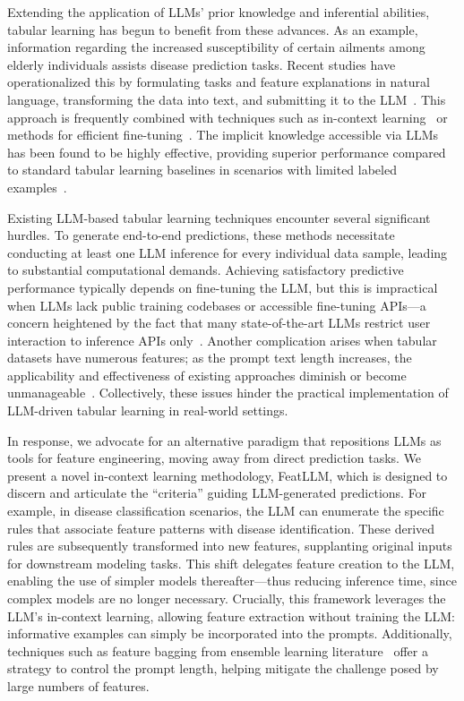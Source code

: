Extending the application of LLMs' prior knowledge and inferential abilities, tabular learning has begun to benefit from these advances. As an example, information regarding the increased susceptibility of certain ailments among elderly individuals assists disease prediction tasks. Recent studies have operationalized this by formulating tasks and feature explanations in natural language, transforming the data into text, and submitting it to the LLM~\cite{dinh2022lift,wang2023anypredict}. This approach is frequently combined with techniques such as in-context learning~\cite{nam2023semi} or methods for efficient fine-tuning~\cite{dinh2022lift,hegselmann2023tabllm}. The implicit knowledge accessible via LLMs has been found to be highly effective, providing superior performance compared to standard tabular learning baselines in scenarios with limited labeled examples~\cite{hegselmann2023tabllm}.

Existing LLM-based tabular learning techniques encounter several significant hurdles. To generate end-to-end predictions, these methods necessitate conducting at least one LLM inference for every individual data sample, leading to substantial computational demands. Achieving satisfactory predictive performance typically depends on fine-tuning the LLM, but this is impractical when LLMs lack public training codebases or accessible fine-tuning APIs—a concern heightened by the fact that many state-of-the-art LLMs restrict user interaction to inference APIs only~\cite{anil2023palm,openai2023gpt4}. Another complication arises when tabular datasets have numerous features; as the prompt text length increases, the applicability and effectiveness of existing approaches diminish or become unmanageable~\cite{liu2023lost}. Collectively, these issues hinder the practical implementation of LLM-driven tabular learning in real-world settings.

In response, we advocate for an alternative paradigm that repositions LLMs as tools for feature engineering, moving away from direct prediction tasks. We present a novel in-context learning methodology, \textsf{FeatLLM}, which is designed to discern and articulate the “criteria” guiding LLM-generated predictions. For example, in disease classification scenarios, the LLM can enumerate the specific rules that associate feature patterns with disease identification. These derived rules are subsequently transformed into new features, supplanting original inputs for downstream modeling tasks. This shift delegates feature creation to the LLM, enabling the use of simpler models thereafter—thus reducing inference time, since complex models are no longer necessary. Crucially, this framework leverages the LLM's in-context learning, allowing feature extraction without training the LLM: informative examples can simply be incorporated into the prompts. Additionally, techniques such as feature bagging from ensemble learning literature~\cite{breiman2001random} offer a strategy to control the prompt length, helping mitigate the challenge posed by large numbers of features.

